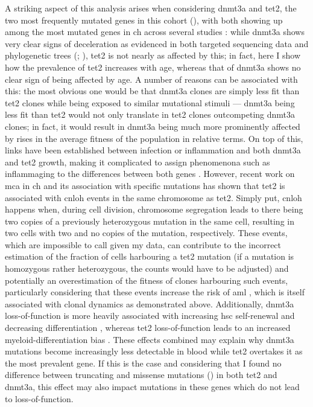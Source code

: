A striking aspect of this analysis arises when considering \ac{dnmt3a} and \ac{tet2}, the two most frequently mutated genes in this cohort (), with both showing up among the most mutated genes in \ac{ch} across several studies \cite{Jaiswal2014-rl,Genovese2014-eu,Dawoud2020-af}: while \ac{dnmt3a} shows very clear signs of deceleration as evidenced in both targeted sequencing data and phylogenetic trees (; ), \ac{tet2} is not nearly as affected by this; in fact, here I show how the prevalence of \ac{tet2} increases with age, whereas that of \ac{dnmt3a} shows no clear sign of being affected by age. A number of reasons can be associated with this: the most obvious one would be that \ac{dnmt3a} clones are simply less fit than \ac{tet2} clones while being exposed to similar mutational stimuli --- \ac{dnmt3a} being less fit than \ac{tet2} would not only translate in \ac{tet2} clones outcompeting \ac{dnmt3a} clones; in fact, it would result in \ac{dnmt3a} being much more prominently affected by rises in the average fitness of the population in relative terms. On top of this, links have been established between infection or inflammation and both \ac{dnmt3a} \cite{Hormaechea_Agulla2019-cd,Hormaechea-Agulla2021-kr} and \ac{tet2} \cite{Cai2018-yi} growth, making it complicated to assign phenomenona such as inflammaging to the differences between both genes \cite{Franceschi2018-be}. However, recent work on \ac{mca} in \ac{ch} and its association with specific mutations has shown that \ac{tet2} is associated with \ac{cnloh} events in the same chromosome as \ac{tet2}. Simply put, \ac{cnloh} happens when, during cell division, chromosome segregation leads to there being two copies of a previously heterozygous mutation in the same cell, resulting in two cells with two and no copies of the mutation, respectively. These events, which are impossible to call given my data, can contribute to the incorrect estimation of the fraction of cells harbouring a \ac{tet2} mutation (if a mutation is homozygous rather heterozygous, the counts would have to be adjusted) and potentially an overestimation of the fitness of clones harbouring such events, particularly considering that these events increase the risk of \ac{aml} \cite{Gao2021-ph}, which is itself associated with clonal dynamics as demonstrated above. Additionally, \ac{dnmt3a} loss-of-function is more heavily associated with increasing \ac{hsc} self-renewal and decreasing differentiation \cite{Jeong2018-pn}, whereas \ac{tet2} loss-of-function leads to an increased myeloid-differentiation bias \cite{Zhang2016-ys}. These effects combined may explain why \ac{dnmt3a} mutations become increasingly less detectable in blood while \ac{tet2} overtakes it as the most prevalent gene. If this is the case and considering that I found no difference between truncating and missense mutations () in both \ac{tet2} and \ac{dnmt3a}, this effect may also impact mutations in these genes which do not lead to loss-of-function. 

